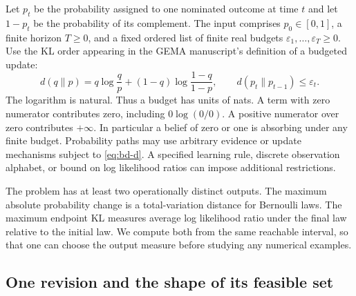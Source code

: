 \documentclass[12pt,letterpaper]{article}
\begin{document}
Let $p_t$ be the probability assigned to one nominated outcome at time $t$ and let $1-p_t$ be the probability of its complement. The input comprises $p_0\in[0,1]$, a finite horizon $T\geq 0$, and a fixed ordered list of finite real budgets $\varepsilon_1,\ldots,\varepsilon_T\geq 0$. Use the KL order appearing in the GEMA manuscript's definition of a budgeted update:
\begin{equation}
 d(q\|p)=q\log\frac{q}{p}+(1-q)\log\frac{1-q}{1-p},
 \qquad d(p_t\|p_{t-1})\leq\varepsilon_t .
 \label{eq:bd-d}
\end{equation}
The logarithm is natural. Thus a budget has units of nats. A term with zero numerator contributes zero, including $0\log(0/0)$. A positive numerator over zero contributes $+\infty$. In particular a belief of zero or one is absorbing under any finite budget. Probability paths may use arbitrary evidence or update mechanisms subject to \eqref{eq:bd-d}. A specified learning rule, discrete observation alphabet, or bound on log likelihood ratios can impose additional restrictions.

The problem has at least two operationally distinct outputs. The maximum absolute probability change is a total-variation distance for Bernoulli laws. The maximum endpoint KL measures average log likelihood ratio under the final law relative to the initial law. We compute both from the same reachable interval, so that one can choose the output measure before studying any numerical examples.

\subsection{One revision and the shape of its feasible set}
\end{document}
